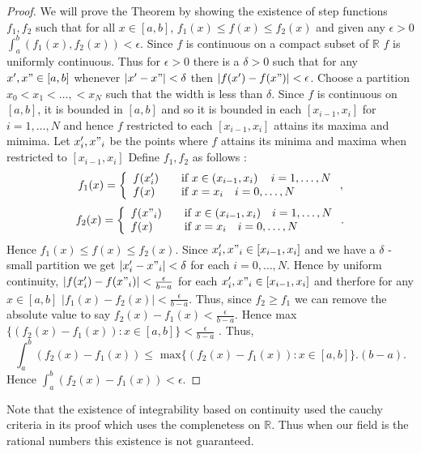 \begin{proof}
    We will prove the Theorem by showing the existence of step functions $f_1,f_2$ such that for all
    $x \in \left[a,b\right]$, $f_1(x) \leq f(x) \leq f_2(x)$ and given any $\epsilon > 0$ 
    $\int_a^b(f_1(x),f_2(x)) <\epsilon$. Since $f$ is continuous on a compact subset of 
    $\mathbb{R}$ $f$ is uniformly continuous. Thus for $\epsilon > 0 $ there is a $\delta > 0$ such
    that for any $x',x" \in \left[a,b\right]$ whenever $\lvert x' - x" \rvert < \delta $ then
    $\lvert f(x') - f(x") \rvert < \epsilon$. Choose a partition $x_0 < x_1 < \dots , < x_N$ such
    that the width is less than $\delta$. Since $f$ is continuous on $\left[a,b\right]$, it is bounded in
    $\left[a,b\right]$ and so it is bounded in each $\left[x_{i-1},x_i\right]$ for $i = 1,\dots,N$
    and hence $f$ restricted to each $\left[x_{i-1},x_i\right]$ attains its maxima and mimima. Let
    $x'_i,x"_i$ be the points where $f$ attains its minima and maxima when restricted to 
    $\left[x_{i-1},x_i\right]$
    Define $f_1,f_2$ as follows :
    \[ f_{1}(x) = \left\{ 
	    \begin{array}{l l}
		f(x'_i) & \quad \text{if } x \in \left(x_{i-1},x_i\right) \quad i = 1,\dots,N \\
		f(x) & \quad \text{if } x = x_i \quad i = 0,\dots,N 
	    \end{array} \right. ,\]
    \[ f_{2}(x) = \left\{ 
	    \begin{array}{l l}
		f(x"_i) & \quad \text{if } x \in (x_{i-1},x_i) \quad i = 1,\dots,N \\
		f(x) & \quad \text{if } x = x_i \quad i = 0,\dots,N 
	    \end{array} \right. .\]
    Hence $f_1(x) \leq f(x) \leq f_2(x)$. Since $x'_i,x"_i \in \left[x_{i-1},x_i\right]$ and we have
    a $\delta$ -small partition we get $\lvert x'_i - x"_i \rvert < \delta$ for each $i =
    0,\dots,N$. Hence by uniform continuity, $\lvert f(x'_i) - f(x"_i) \rvert <
    \frac{\epsilon}{b-a}$ for each $x'_i,x"_i \in \left[x_{i-1},x_i\right]$ and therfore 
    for any $x \in \left[a,b\right]$ $\lvert f_1(x) - f_2(x) \rvert < \frac{\epsilon}{b-a}$. Thus, 
    since $f_2 \geq f_1$ we can remove the absolute value to say 
    $ f_2(x) - f_1(x) < \frac{\epsilon}{b-a}$. Hence max$\lbrace (f_2(x) - f_1(x)) : x \in 
    \left[a,b\right]\rbrace < \frac{\epsilon}{b-a}$ . Thus,
    \[ \int_a^b(f_2(x) - f_1(x)) \leq \text{ max} \lbrace (f_2(x) - f_1(x)) : x \in
	\left[a,b\right]\rbrace .(b-a) .\] Hence $\int_a^b(f_2(x) - f_1(x)) < \epsilon$.

\end{proof}
Note that the existence of integrability based on continuity used the cauchy criteria in its proof
which uses the complenetess on $\mathbb{R}$. Thus when our field is the rational numbers this
existence is not guaranteed.   

